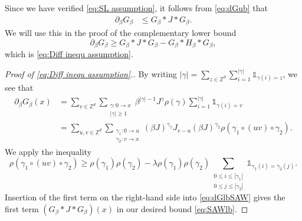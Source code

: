 \documentclass[11pt,a4paper]{article}
\numberwithin{equation}{section}
\theoremstyle{plain}
\theoremstyle{definition}
\newcommand\1{\mathds{1}}
\begin{document}
Since we have verified \eqref{eq:SL assumption},
it follows from \eqref{eq:dGub} that
 \begin{align}
 	 \partial_\beta G_{\beta}&\leq G_\beta*J*G_\beta .
 \label{eq:diff ineq 1 WSAW intro}
  \end{align}
We will use this in the proof of the complementary lower bound
\begin{equation}
\label{eq:SAWlb}
    \partial_\beta G_{\beta} \ge G_\beta*J*G_\beta - G_\beta*H_\beta*G_\beta,
\end{equation}
which is \eqref{eq:Diff inequ assumption}.

\begin{proof}[Proof of \eqref{eq:Diff inequ assumption}.]
By writing $|\gamma|=
\sum_{z\in \mathbb Z^d}\sum_{i=1}^{|\gamma|}\mathds{1}_{\gamma(i)=z}$,
we see that
\begin{align}
\label{eq:dGlbSAW}
    \partial_\beta G_{\beta}(x)
    &=
    \sum_{v\in \mathbb Z^d}
    \sum_{\substack{\gamma:0\to x \\|\gamma|\ge 1}}\beta^{|\gamma|-1}J^\gamma
    \rho(\gamma)
    \sum_{i=1}^{|\gamma|}\mathds{1}_{\gamma(i)=v}
    \nonumber \\
    & =
    \sum_{u,v\in \mathbb Z^d}
    \sum_{\substack{\gamma_1 : 0 \rightarrow u \\\gamma_2 : v \rightarrow x}}
    (\beta J)^{\gamma_1} J_{v-u} (\beta J)^{\gamma_2}
    \rho(\gamma_1 \circ  (uv) \circ \gamma_2).
\end{align}
We apply the inequality
\begin{equation}
\label{eq : lower bound path decomp wsaw}
\rho(\gamma_1\circ (uv)\circ \gamma_2)
\geq \rho(\gamma_1)\rho(\gamma_2)
-\lambda \rho(\gamma_1)\rho(\gamma_2)\sum_{\substack{0\leq i \leq |\gamma_1|\\0\leq j\leq |\gamma_2|}}\mathds{1}_{\gamma_1(i)=\gamma_2(j)}.
\end{equation}
Insertion of the first term on the right-hand side
into \eqref{eq:dGlbSAW} gives the first term
$(G_\beta*J*G_\beta)(x)$ in our desired bound
\eqref{eq:SAWlb}.



\end{proof}
\end{document}
